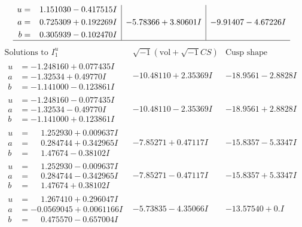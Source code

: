 \documentclass[1p]{elsarticle_modified}
\theoremstyle{definition}
\newcommand{\I}{\sqrt{-1}}
\begin{document}
$$\begin{array}{c|c|c}
\begin{aligned}
u &= \phantom{-}1.151030 - 0.417515 I \\
a &= \phantom{-}0.725309 + 0.192269 I \\
b &= \phantom{-}0.305939 - 0.102470 I\end{aligned}
 & -5.78366 + 3.80601 I & -9.91407 - 4.67226 I\\
 \hline 
 \end{array}$$\newpage$$\begin{array}{c|c|c}  
\text{Solutions to }I^u_{1}& \I (\text{vol} + \sqrt{-1}CS) & \text{Cusp shape}\\
 \hline 
\begin{aligned}
u &= -1.248160 + 0.077435 I \\
a &= -1.32534 + 0.49770 I \\
b &= -1.141000 - 0.123861 I\end{aligned}
 & -10.48110 + 2.35369 I & -18.9561 - 2.8828 I \\ \hline\begin{aligned}
u &= -1.248160 - 0.077435 I \\
a &= -1.32534 - 0.49770 I \\
b &= -1.141000 + 0.123861 I\end{aligned}
 & -10.48110 - 2.35369 I & -18.9561 + 2.8828 I \\ \hline\begin{aligned}
u &= \phantom{-}1.252930 + 0.009637 I \\
a &= \phantom{-}0.284744 + 0.342965 I \\
b &= \phantom{-}1.47674 - 0.38102 I\end{aligned}
 & -7.85271 + 0.47117 I & -15.8357 - 5.3347 I \\ \hline\begin{aligned}
u &= \phantom{-}1.252930 - 0.009637 I \\
a &= \phantom{-}0.284744 - 0.342965 I \\
b &= \phantom{-}1.47674 + 0.38102 I\end{aligned}
 & -7.85271 - 0.47117 I & -15.8357 + 5.3347 I \\ \hline\begin{aligned}
u &= \phantom{-}1.267410 + 0.296047 I \\
a &= -0.0569045 + 0.0061166 I \\
b &= \phantom{-}0.475570 - 0.657004 I\end{aligned}
 & -5.73835 - 4.35066 I & -13.57540 + 0. I\phantom{ +0.000000I} \\ \hline\begin{aligned}

\end{aligned}
\end{array}$$
\end{document}
